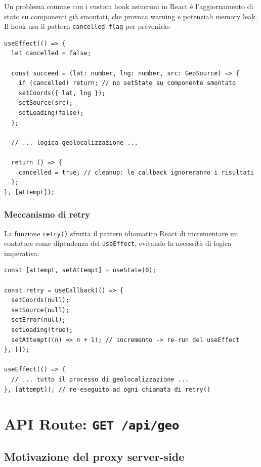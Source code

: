 \documentclass[12pt, a4paper]{article}
\begin{document}
Un problema comune con i custom hook asincroni in React è l'aggiornamento di
stato su componenti già smontati, che provoca warning e potenziali memory
leak. Il hook usa il pattern \texttt{cancelled flag} per prevenirlo:

\begin{lstlisting}[caption={Pattern cancelled flag per cleanup asincrono}]
useEffect(() => {
  let cancelled = false;

  const succeed = (lat: number, lng: number, src: GeoSource) => {
    if (cancelled) return; // no setState su componente smontato
    setCoords({ lat, lng });
    setSource(src);
    setLoading(false);
  };

  // ... logica geolocalizzazione ...

  return () => {
    cancelled = true; // cleanup: le callback ignoreranno i risultati
  };
}, [attempt]);
\end{lstlisting}

\subsubsection{Meccanismo di retry}

La funzione \texttt{retry()} sfrutta il pattern idiomatico React di
incrementare un contatore come dipendenza del \texttt{useEffect}, evitando
la necessità di logica imperativa:

\begin{lstlisting}[caption={Implementazione del retry tramite contatore}]
const [attempt, setAttempt] = useState(0);

const retry = useCallback(() => {
  setCoords(null);
  setSource(null);
  setError(null);
  setLoading(true);
  setAttempt((n) => n + 1); // incremento -> re-run del useEffect
}, []);

useEffect(() => {
  // ... tutto il processo di geolocalizzazione ...
}, [attempt]); // re-eseguito ad ogni chiamata di retry()
\end{lstlisting}

\section{API Route: \texttt{GET /api/geo}}

\subsection{Motivazione del proxy server-side}
\end{document}
